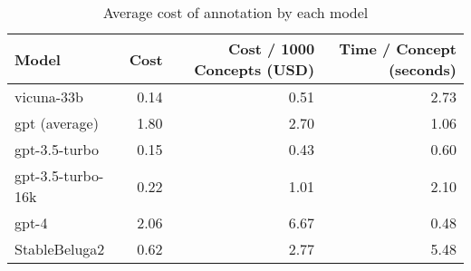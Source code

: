 \begin{table}[htpb]
  \centering
  \begin{tabular}{lrrr}
    \hline
    Model & Cost & Cost / 1000 Concepts (USD) & Time / Concept (seconds) \\
    \hline
    vicuna-33b & 0.14 & 0.51 & 2.73 \\
    gpt (average) & 1.80 & 2.70 & 1.06 \\
    gpt-3.5-turbo & 0.15 & 0.43 & 0.60 \\
    gpt-3.5-turbo-16k & 0.22 & 1.01 & 2.10 \\
    gpt-4 & 2.06 & 6.67 & 0.48 \\
    StableBeluga2 & 0.62 & 2.77 & 5.48 \\
    \hline
  \end{tabular}
  \caption[Cost Analysis]{Average cost of annotation by each model}
  \label{tab:open-cost}
\end{table}
